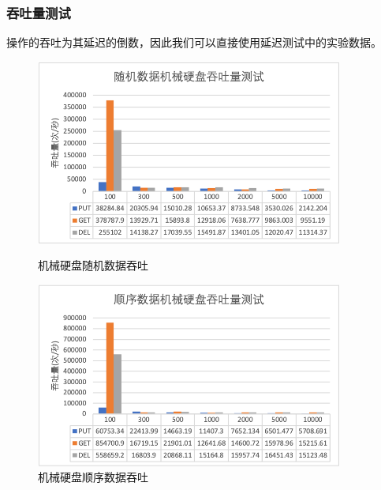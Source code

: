 \documentclass[fontset=windows]{article}
\begin{document}
\subsubsection{吞吐量测试}
操作的吞吐为其延迟的倒数，因此我们可以直接使用延迟测试中的实验数据。
\begin{figure}[H]
\begin{minipage}[t]{0.5\linewidth}   
    \centering   
    \includegraphics[width=0.9\textwidth]{img/random_throughput.png}   
    \caption{机械硬盘随机数据吞吐}   
    \label{fig:r_t}
\end{minipage}
\begin{minipage}[t]{0.5\linewidth} %
    \centering
    \includegraphics[width=0.9\textwidth]{img/sequential_throughtput.png}
    \caption{机械硬盘顺序数据吞吐}
    \label{fig:s_t}
\end{minipage} 
\end{figure}
\end{document}
